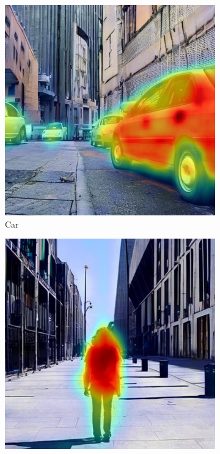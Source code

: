 \begin{figure}
\centering
  \begin{subfigure}{0.24\columnwidth}
   \includegraphics[width=\columnwidth]{img/4-experiments/example_daam_heatmap_car_2_epochs500.png}
   \caption{Car}
   \label{subfig:dataset-example-car-daam-linear-optimized}
  \end{subfigure}
  \begin{subfigure}{0.24\columnwidth}
   \includegraphics[width=\columnwidth]{img/4-experiments/example_daam_heatmap_person_2_epochs500.png}

\end{subfigure}
\end{figure}
